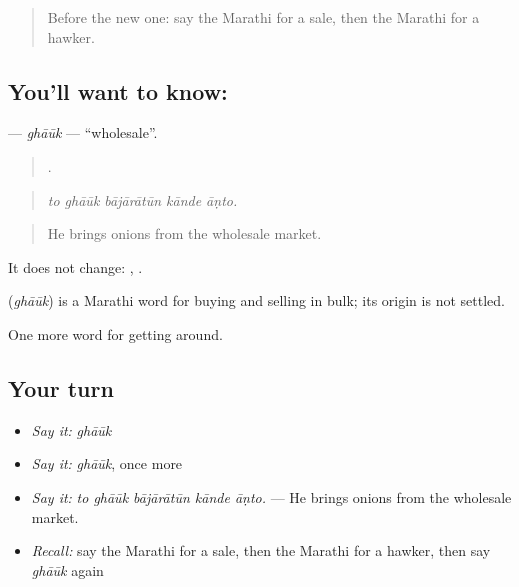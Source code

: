 \label{lesson:MR-C424-ghauk}



\begin{quote}
Before the new one: say the Marathi for a sale, then the Marathi for a hawker.
\end{quote}

\subsection*{You'll want to know: }
\textbf{} — \emph{ghāūk} — \textquotedblleft{}wholesale\textquotedblright{}.

\begin{quote}
    .
\end{quote}

\begin{quote}
\emph{to ghāūk bājārātūn kānde āṇto.}
\end{quote}

\begin{quote}
He brings onions from the wholesale market.
\end{quote}

It does not change:  ,  .

\begin{cousinweb}
\textbf{} (\emph{ghāūk}) is a Marathi word for buying and selling in bulk; its origin is not settled.
\end{cousinweb}

\begin{grammarlens}[title={What you've built}]
One more word for getting around.
\end{grammarlens}

\subsection*{Your turn}
\begin{itemize}
\raggedright
  \item \emph{Say it:} \emph{ghāūk}
  \item \emph{Say it:} \emph{ghāūk}, once more
  \item \emph{Say it:} \emph{to ghāūk bājārātūn kānde āṇto.} — He brings onions from the wholesale market.
  \item \emph{Recall:} say the Marathi for a sale, then the Marathi for a hawker, then say \emph{ghāūk} again
\end{itemize}

